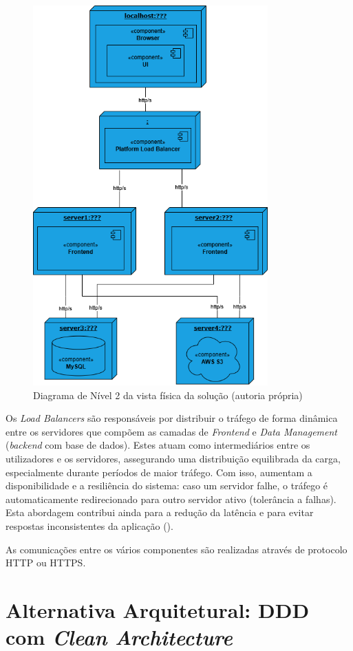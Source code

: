 \begin{figure}[H]
    \centering
    \includegraphics[height=5.75in,keepaspectratio]{frontmatter/assets/diagrams/Physical View/physical_view_lv2.drawio.png}
    \caption{Diagrama de Nível 2 da vista física da solução (autoria própria)}
    \label{fig:physical_view_lv2}
\end{figure}

Os \textit{Load Balancers} são responsáveis por distribuir o tráfego de forma dinâmica entre os servidores que compõem as camadas de \textit{Frontend} e \textit{Data Management} (\textit{backend} com base de dados). Estes atuam como intermediários entre os utilizadores e os servidores, assegurando uma distribuição equilibrada da carga, especialmente durante períodos de maior tráfego. Com isso, aumentam a disponibilidade e a resiliência do sistema: caso um servidor falhe, o tráfego é automaticamente redirecionado para outro servidor ativo (tolerância a falhas). Esta abordagem contribui ainda para a redução da latência e para evitar respostas inconsistentes da aplicação (\Cite{F52025}).

As comunicações entre os vários componentes são realizadas através de protocolo HTTP ou HTTPS.

\section{Alternativa Arquitetural: DDD com \textit{Clean Architecture}}
\label{sec:SolAlt}

